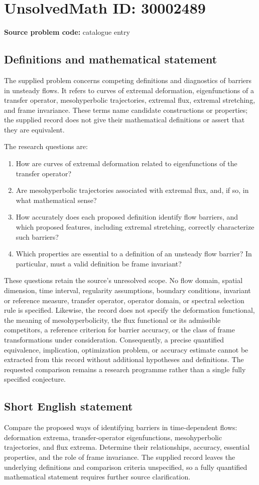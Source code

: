 \documentclass[11pt]{article}
\begin{document}
\section*{UnsolvedMath ID: 30002489}
\textbf{Source problem code:} catalogue entry
\subsection{Definitions and mathematical statement}
The supplied problem concerns competing definitions and diagnostics of barriers in unsteady flows. It refers to curves of extremal deformation, eigenfunctions of a transfer operator, mesohyperbolic trajectories, extremal flux, extremal stretching, and frame invariance. These terms name candidate constructions or properties; the supplied record does not give their mathematical definitions or assert that they are equivalent.

The research questions are:
\begin{enumerate}
\item How are curves of extremal deformation related to eigenfunctions of the transfer operator?
\item Are mesohyperbolic trajectories associated with extremal flux, and, if so, in what mathematical sense?
\item How accurately does each proposed definition identify flow barriers, and which proposed features, including extremal stretching, correctly characterize such barriers?
\item Which properties are essential to a definition of an unsteady flow barrier? In particular, must a valid definition be frame invariant?
\end{enumerate}

These questions retain the source's unresolved scope. No flow domain, spatial dimension, time interval, regularity assumptions, boundary conditions, invariant or reference measure, transfer operator, operator domain, or spectral selection rule is specified. Likewise, the record does not specify the deformation functional, the meaning of mesohyperbolicity, the flux functional or its admissible competitors, a reference criterion for barrier accuracy, or the class of frame transformations under consideration. Consequently, a precise quantified equivalence, implication, optimization problem, or accuracy estimate cannot be extracted from this record without additional hypotheses and definitions. The requested comparison remains a research programme rather than a single fully specified conjecture.
\subsection{Short English statement}
Compare the proposed ways of identifying barriers in time-dependent flows: deformation extrema, transfer-operator eigenfunctions, mesohyperbolic trajectories, and flux extrema. Determine their relationships, accuracy, essential properties, and the role of frame invariance. The supplied record leaves the underlying definitions and comparison criteria unspecified, so a fully quantified mathematical statement requires further source clarification.
\end{document}
